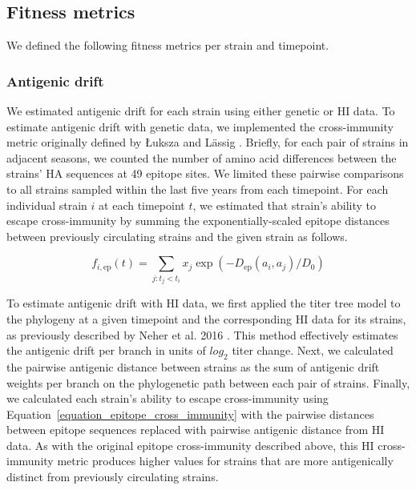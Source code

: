 \subsection*{Fitness metrics}

We defined the following fitness metrics per strain and timepoint.

\subsubsection*{Antigenic drift}

We estimated antigenic drift for each strain using either genetic or HI data.
To estimate antigenic drift with genetic data, we implemented the cross-immunity metric originally defined by {\L}uksza and L\"assig \cite{Luksza:2014hj}.
Briefly, for each pair of strains in adjacent seasons, we counted the number of amino acid differences between the strains' HA sequences at 49 epitope sites.
We limited these pairwise comparisons to all strains sampled within the last five years from each timepoint.
For each individual strain $i$ at each timepoint $t$, we estimated that strain's ability to escape cross-immunity by summing the exponentially-scaled epitope distances between previously circulating strains and the given strain as follows.

\begin{equation}
    f_{i,\mathrm{ep}}(t) = \sum_{j: t_{j} < t_{i}}{x_{j}\exp{(-D_{\mathrm{ep}}(a_{i}, a_{j}) / D_{0})}}
    \label{equation_epitope_cross_immunity}
\end{equation}

To estimate antigenic drift with HI data, we first applied the titer tree model to the phylogeny at a given timepoint and the corresponding HI data for its strains, as previously described by Neher et al. 2016 \cite{Neher:2016hy}.
This method effectively estimates the antigenic drift per branch in units of $log_{2}$ titer change.
Next, we calculated the pairwise antigenic distance between strains as the sum of antigenic drift weights per branch on the phylogenetic path between each pair of strains.
Finally, we calculated each strain's ability to escape cross-immunity using Equation~\ref{equation_epitope_cross_immunity} with the pairwise distances between epitope sequences replaced with pairwise antigenic distance from HI data.
As with the original epitope cross-immunity described above, this HI cross-immunity metric produces higher values for strains that are more antigenically distinct from previously circulating strains.

